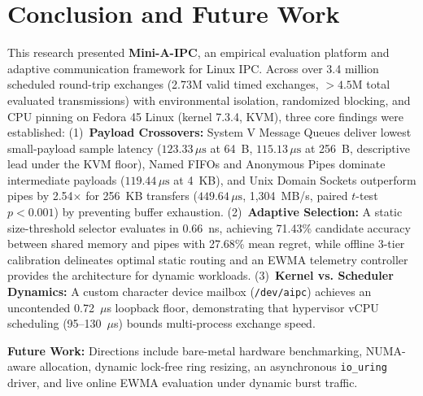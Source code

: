 \newpage

\balance
\section{Conclusion and Future Work}
\label{sec:conclusion}

This research presented \textbf{Mini-A-IPC}, an empirical evaluation platform and adaptive communication framework for Linux IPC. Across over 3.4 million scheduled round-trip exchanges (2.73M valid timed exchanges, $>4.5$M total evaluated transmissions) with environmental isolation, randomized blocking, and CPU pinning on Fedora 45 Linux (kernel 7.3.4, KVM), three core findings were established:
(1)~\textbf{Payload Crossovers:} System V Message Queues deliver lowest small-payload sample latency ($123.33\,\mu\text{s}$ at 64~B, $115.13\,\mu\text{s}$ at 256~B, descriptive lead under the KVM floor), Named FIFOs and Anonymous Pipes dominate intermediate payloads ($119.44\,\mu\text{s}$ at 4~KB), and Unix Domain Sockets outperform pipes by 2.54$\times$ for 256~KB transfers ($449.64\,\mu\text{s}$, 1,304~MB/s, paired $t$-test $p < 0.001$) by preventing buffer exhaustion.
(2)~\textbf{Adaptive Selection:} A static size-threshold selector evaluates in 0.66~ns, achieving 71.43\% candidate accuracy between shared memory and pipes with 27.68\% mean regret, while offline 3-tier calibration delineates optimal static routing and an EWMA telemetry controller provides the architecture for dynamic workloads.
(3)~\textbf{Kernel vs. Scheduler Dynamics:} A custom character device mailbox (\texttt{/dev/aipc}) achieves an uncontended 0.72~$\mu$s loopback floor, demonstrating that hypervisor vCPU scheduling (95--130~$\mu$s) bounds multi-process exchange speed.

\textbf{Future Work:} Directions include bare-metal hardware benchmarking, NUMA-aware allocation, dynamic lock-free ring resizing, an asynchronous \texttt{io\_uring} driver, and live online EWMA evaluation under dynamic burst traffic.
